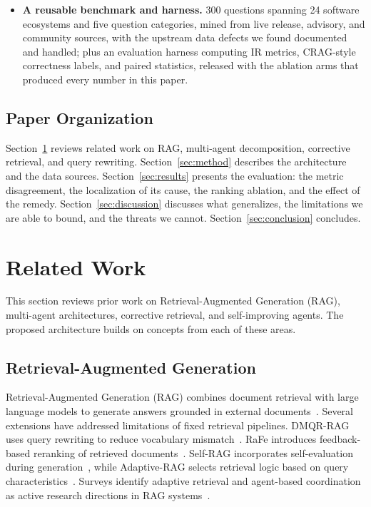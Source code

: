 \documentclass[acmsmall,review,anonymous,screen]{acmart}
\begin{document}
\begin{itemize}
  \item \textbf{A reusable benchmark and harness.} 300 questions spanning 24
  software ecosystems and five question categories, mined from live release,
  advisory, and community sources, with the upstream data defects we found
  documented and handled; plus an evaluation harness computing IR metrics,
  CRAG-style correctness labels, and paired statistics, released with the
  ablation arms that produced every number in this paper.
\end{itemize}

\subsection{Paper Organization}

Section~\ref{sec:related} reviews related work on RAG, multi-agent
decomposition, corrective retrieval, and query rewriting.
Section~\ref{sec:method} describes the architecture and the data sources.
Section~\ref{sec:results} presents the evaluation: the metric disagreement, the
localization of its cause, the ranking ablation, and the effect of the remedy.
Section~\ref{sec:discussion} discusses what generalizes, the limitations we are
able to bound, and the threats we cannot.
Section~\ref{sec:conclusion} concludes.

\section{Related Work}\label{sec:related}

This section reviews prior work on Retrieval-Augmented Generation (RAG),
multi-agent architectures, corrective retrieval, and self-improving
agents. The proposed architecture builds on concepts from each of these
areas.

\subsection{Retrieval-Augmented Generation}

Retrieval-Augmented Generation (RAG) combines document retrieval with
large language models to generate answers grounded in external
documents~\cite{lewis2020rag}. Several extensions have addressed
limitations of fixed retrieval pipelines. DMQR-RAG uses query rewriting
to reduce vocabulary mismatch~\cite{gao2024dmqr}. RaFe introduces
feedback-based reranking of retrieved documents~\cite{ma2023rafe}.
Self-RAG incorporates self-evaluation during generation~\cite{asai2024selfrag},
while Adaptive-RAG selects retrieval logic based on query
characteristics~\cite{jeong2024adaptiverag}. Surveys identify adaptive
retrieval and agent-based coordination as active research directions in
RAG systems~\cite{gao2023survey}.
\end{document}
